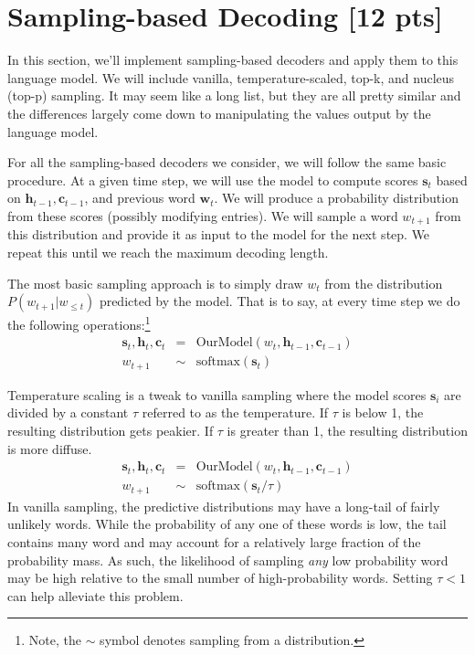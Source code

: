 \documentclass[a4paper,10pt]{article}
\begin{document}
\section{Sampling-based Decoding [12 pts]}

In this section, we'll implement sampling-based decoders and apply them to this language model. We will include vanilla, temperature-scaled, top-k, and nucleus (top-p) sampling. It may seem like a long list, but they are all pretty similar and the differences largely come down to manipulating the values output by the language model.

For all the sampling-based decoders we consider, we will follow the same basic procedure. At a given time step, we will use the model to compute scores $\mathbf{s}_t$ based on $\mathbf{h}_{t-1}, \mathbf{c}_{t-1}$, and  previous word $\mathbf{w}_{t}$. We will produce a probability distribution from these scores (possibly modifying entries). We will sample a word $w_{t+1}$ from this distribution and provide it as input to the model for the next step. We repeat this until we reach the maximum decoding length.

 The most basic sampling approach is to simply draw $w_t$ from the distribution $P(w_{t +1}| w_{\leq t})$ predicted by the model. That is to say, at every time step we do the following operations:\footnote{Note, the $\sim$ symbol denotes sampling from a distribution.}
%
\begin{eqnarray}
\mathbf{s}_t, \mathbf{h}_{t}, \mathbf{c}_{t} &=& \mbox{OurModel}\left(w_{t}, \mathbf{h}_{t-1}, \mathbf{c}_{t-1}\right)\\
w_{t+1} &\sim& \mbox{softmax}(\mathbf{s}_t)
\end{eqnarray} 
%

 Temperature scaling is a tweak to vanilla sampling where the model scores $\mathbf{s}_i$ are divided by a constant $\tau$ referred to as the temperature. If $\tau$ is below 1, the resulting distribution gets peakier. If $\tau$ is greater than 1, the resulting distribution is more diffuse. 
%
\begin{eqnarray}
\mathbf{s}_t, \mathbf{h}_{t}, \mathbf{c}_{t} &=& \mbox{OurModel}\left(w_{t}, \mathbf{h}_{t-1}, \mathbf{c}_{t-1}\right)\\
w_{t+1} &\sim& \mbox{softmax}(\mathbf{s}_t/\tau)
\end{eqnarray}
%
In vanilla sampling, the predictive distributions may have a long-tail of fairly unlikely words. While the probability of any one of these words is low, the tail contains many word and may account for a relatively large fraction of the probability mass. As such, the likelihood of sampling \emph{any} low probability word may be high relative to the small number of high-probability words. Setting $\tau < 1$ can help alleviate this problem. 
\end{document}

